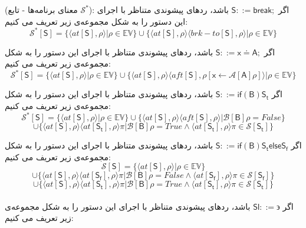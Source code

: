 \begin{defn}
	(معنای برنامه‌ها - تابع $\mathcal{S}^*$): 
اگر $        \mathsf{S} ::= \mathsf{break;}  $ باشد، ردهای پیشوندی متناظر با اجرای این دستور را به شکل مجموعه‌ی زیر تعریف می کنیم:
$$\mathcal{S^*} [\mathsf{S}] = \{ \langle at[\mathsf{S}] , \rho \rangle | \rho \in \mathbb{EV}       \} \cup     \{ \langle at[\mathsf{S}] , \rho \rangle \langle brk-to[\mathsf{S}] , \rho \rangle | \rho \in \mathbb{EV}       \}             $$   


اگر $        \mathsf{S} ::=  \mathsf{x\doteq A;}  $ باشد، ردهای پیشوندی متناظر با اجرای این دستور را به شکل مجموعه‌ی زیر تعریف می کنیم:
$$\mathcal{S^*} [\mathsf{S}] = \{ \langle at[\mathsf{S}] , \rho \rangle | \rho \in \mathbb{EV}       \} \cup     \{ \langle at[\mathsf{S}] , \rho \rangle \langle aft[\mathsf{S}] , \rho[\mathsf{x}\leftarrow \mathcal{A}[\mathsf{A}]\rho] \rangle | \rho \in \mathbb{EV}       \}             $$   

اگر $         \mathsf{S} ::= \mathsf{if}  \mathsf{ (B) S_t}  $ باشد، ردهای پیشوندی متناظر با اجرای این دستور را به شکل مجموعه‌ی زیر تعریف می کنیم:
$$\mathcal{S^*} [\mathsf{S}] = \{ \langle at[\mathsf{S}] , \rho \rangle | \rho \in \mathbb{EV}       \} \cup     \{ \langle at[\mathsf{S}] , \rho \rangle \langle aft[\mathsf{S}] , \rho \rangle | \mathcal{B}[\mathsf{B}] \rho =False      \} 
$$$$\cup    \{ \langle at[\mathsf{S}] , \rho \rangle \langle at[\mathsf{S_t}] , \rho \rangle 
\pi | \mathcal{B}[\mathsf{B}] \rho =True  \wedge   \langle  at[\mathsf{S_t}]  , \rho \rangle \pi \in \mathcal{S} [\mathsf{S_t}]    \}          $$ 


اگر $         \mathsf{S} ::= \mathsf{if}  \mathsf{ (B) S_t else S_f}  $ باشد، ردهای پیشوندی متناظر با اجرای این دستور را به شکل مجموعه‌ی زیر تعریف می کنیم:
$$\mathcal{S} [\mathsf{S}] = \{ \langle at[\mathsf{S}] , \rho \rangle | \rho \in \mathbb{EV}       \} $$$$\cup     \{ \langle at[\mathsf{S}] , \rho \rangle \langle at[\mathsf{S_f}] , \rho \rangle 
\pi | \mathcal{B}[\mathsf{B}] \rho =False  \wedge   \langle  at[\mathsf{S_f}]  , \rho \rangle \pi \in \mathcal{S} [\mathsf{S_f}]    \}  
$$$$\cup    \{ \langle at[\mathsf{S}] , \rho \rangle \langle at[\mathsf{S_t}] , \rho \rangle 
\pi | \mathcal{B}[\mathsf{B}] \rho =True  \wedge   \langle  at[\mathsf{S_t}]  , \rho \rangle \pi \in \mathcal{S} [\mathsf{S_t}]    \}          $$ \\


اگر 
$         \mathsf{Sl} ::= \backepsilon  $
 باشد، ردهای پیشوندی متناظر با اجرای این دستور را به شکل مجموعه‌ی زیر تعریف می کنیم:


\end{defn}
